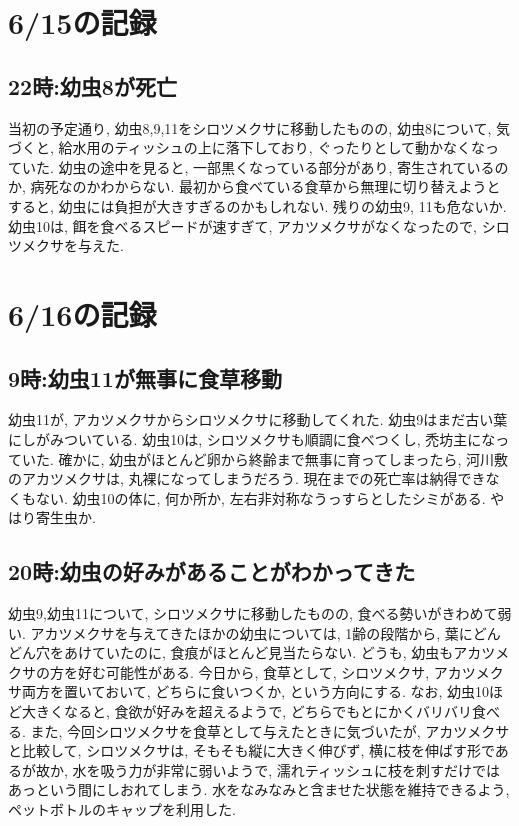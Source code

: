 \documentclass{jsarticle}
\begin{document}
\section{6/15の記録}
\subsection{22時:幼虫8が死亡}
当初の予定通り, 幼虫8,9,11をシロツメクサに移動したものの, 幼虫8について, 気づくと, 給水用のティッシュの上に落下しており, ぐったりとして動かなくなっていた. 
幼虫の途中を見ると, 一部黒くなっている部分があり, 寄生されているのか, 病死なのかわからない. 
最初から食べている食草から無理に切り替えようとすると, 幼虫には負担が大きすぎるのかもしれない. 残りの幼虫9, 11も危ないか. 
幼虫10は, 餌を食べるスピードが速すぎて, アカツメクサがなくなったので, シロツメクサを与えた. 

\section{6/16の記録}
\subsection{9時:幼虫11が無事に食草移動}
幼虫11が, アカツメクサからシロツメクサに移動してくれた. 幼虫9はまだ古い葉にしがみついている. 
幼虫10は, シロツメクサも順調に食べつくし, 禿坊主になっていた. 確かに, 幼虫がほとんど卵から終齢まで無事に育ってしまったら, 河川敷のアカツメクサは, 丸裸になってしまうだろう. 
現在までの死亡率は納得できなくもない. 
幼虫10の体に, 何か所か, 左右非対称なうっすらとしたシミがある. やはり寄生虫か. 

\subsection{20時:幼虫の好みがあることがわかってきた}
幼虫9,幼虫11について, シロツメクサに移動したものの, 食べる勢いがきわめて弱い. アカツメクサを与えてきたほかの幼虫については, 1齢の段階から, 葉にどんどん穴をあけていたのに, 食痕がほとんど見当たらない. どうも, 幼虫もアカツメクサの方を好む可能性がある. 
今日から, 食草として, シロツメクサ, アカツメクサ両方を置いておいて, どちらに食いつくか, という方向にする. 
なお, 幼虫10ほど大きくなると, 食欲が好みを超えるようで, どちらでもとにかくバリバリ食べる. 
また, 今回シロツメクサを食草として与えたときに気づいたが, アカツメクサと比較して, シロツメクサは, そもそも縦に大きく伸びず, 横に枝を伸ばす形であるが故か, 
水を吸う力が非常に弱いようで, 濡れティッシュに枝を刺すだけではあっという間にしおれてしまう. 
水をなみなみと含ませた状態を維持できるよう, ペットボトルのキャップを利用した. 
\end{document}
